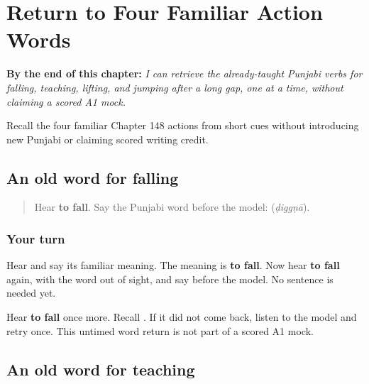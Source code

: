 
\chapter{Return to Four Familiar Action Words}
\label{ch:pa-four-familiar-action-words}

\begin{chapteropening}
\textbf{By the end of this chapter:} \emph{I can retrieve the already-taught Punjabi verbs for falling, teaching, lifting, and jumping after a long gap, one at a time, without claiming a scored A1 mock.}

Recall the four familiar Chapter 148 actions from short cues without introducing new Punjabi or claiming scored writing credit.
\end{chapteropening}

\section[\texorpdfstring{\pa{ਡਿੱਗਣਾ} (ḍiggṇā)}{ਡਿੱਗਣਾ (ḍiggṇā)}]{An old word for falling}

\label{lesson:PA-R160-fall-again}



\begin{quote}
Hear \textbf{to fall}. Say the Punjabi word before the model: \textbf{} (\emph{ḍiggṇā}).
\end{quote}

\subsection*{Your turn}
Hear \textbf{} and say its familiar meaning. The meaning is \textbf{to fall}. Now hear \textbf{to fall} again, with the word out of sight, and say \textbf{} before the model. No sentence is needed yet.

\begin{tcolorbox}[breakable,colback=teal!4,colframe=teal!35!black,title={Before you move on}]
Hear \textbf{to fall} once more. Recall \textbf{}. If it did not come back, listen to the model and retry once. This untimed word return is not part of a scored A1 mock.
\end{tcolorbox}
\section[\texorpdfstring{\pa{ਸਿਖਾਉਣਾ} (sikhāuṇā)}{ਸਿਖਾਉਣਾ (sikhāuṇā)}]{An old word for teaching}

